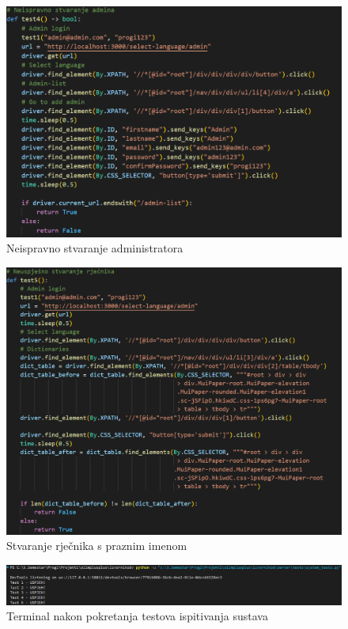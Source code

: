 \begin{figure}[htp]
    \includegraphics[scale=0.5]{dijagrami/test4.png}
    \centering
    \caption{Neispravno stvaranje administratora}
    \label{fig:sys-4}
\end{figure}

\begin{figure}[htp]
    \includegraphics[scale=0.5]{dijagrami/test5.png}
    \centering
    \caption{Stvaranje rječnika s praznim imenom}
    \label{fig:sys-5}
\end{figure}

\begin{figure}[htp]
    \includegraphics[scale=0.35]{dijagrami/terminal_screen.png}
    \centering
    \caption{Terminal nakon pokretanja testova ispitivanja sustava}
	\label{fig:sys-res}
\end{figure}

